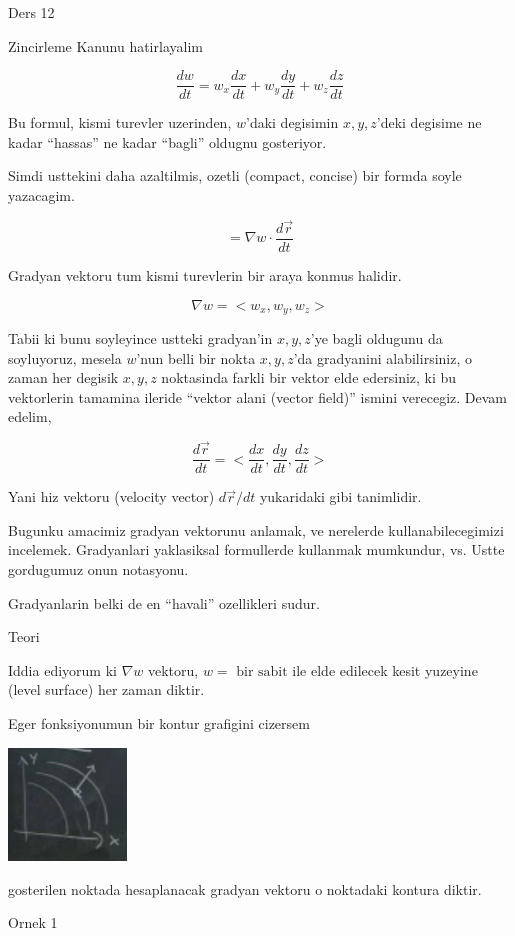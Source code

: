 \documentclass[12pt,fleqn]{article}\usepackage{../common}
\begin{document}
Ders 12

Zincirleme Kanunu hatirlayalim

\[ \frac{dw}{dt}  = w_x \frac{dx}{dt} + 
w_y \frac{dy}{dt} + 
w_z \frac{dz}{dt}  \]

Bu formul, kismi turevler uzerinden, $w$'daki degisimin $x,y,z$'deki
degisime ne kadar ``hassas'' ne kadar ``bagli'' oldugnu gosteriyor.

Simdi usttekini daha azaltilmis, ozetli (compact, concise) bir formda soyle
yazacagim. 

\[ = \nabla w \cdot  \frac{d\vec{r}}{dt} \]

Gradyan vektoru tum kismi turevlerin bir araya konmus halidir. 

\[ \nabla w = <w_x, w_y, w_z> \]

Tabii ki bunu soyleyince ustteki gradyan'in $x,y,z$'ye bagli oldugunu da
soyluyoruz, mesela $w$'nun belli bir nokta $x,y,z$'da gradyanini
alabilirsiniz, o zaman her degisik $x,y,z$ noktasinda farkli bir vektor
elde edersiniz, ki bu vektorlerin tamamina ileride ``vektor alani (vector
field)'' ismini verecegiz. Devam edelim, 

\[ \frac{d\vec{r}}{dt} = < \frac{dx}{dt}, \frac{dy}{dt}, \frac{dz}{dt} > \]

Yani hiz vektoru (velocity vector) $d\vec{r}/{dt}$ yukaridaki gibi
tanimlidir.

Bugunku amacimiz gradyan vektorunu anlamak, ve nerelerde
kullanabilecegimizi incelemek. Gradyanlari yaklasiksal formullerde
kullanmak mumkundur, vs. Ustte gordugumuz onun notasyonu. 

Gradyanlarin belki de en ``havali'' ozellikleri sudur. 

Teori

Iddia ediyorum ki $\nabla w$ vektoru, $w = \textrm{ bir sabit }$ile elde
edilecek kesit yuzeyine (level surface) her zaman diktir.

Eger fonksiyonumun bir kontur grafigini cizersem

\includegraphics[height=3cm]{12_1.png}

gosterilen noktada hesaplanacak gradyan vektoru o noktadaki kontura
diktir. 

Ornek 1
\end{document}
